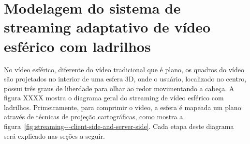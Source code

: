 


\chapter{Modelagem do sistema de streaming adaptativo de vídeo esférico com ladrilhos}\label{Cap:Problem Design}

No vídeo esférico, diferente do vídeo tradicional que é plano, os quadros do vídeo são projetados no interior de uma esfera 3D, onde o usuário, localizado no centro, possui três graus de liberdade para olhar ao redor movimentando a cabeça. A figura XXXX mostra o diagrama geral do streaming de vídeo esférico com ladrilhos. Primeiramente, para comprimir o vídeo, a esfera é mapeada um plano através de técnicas de projeção cartográficas, como mostra a figura~\ref{fig:streaming---client-side-and-server-side}. Cada etapa deste diagrama será explicado nas seções a seguir.

